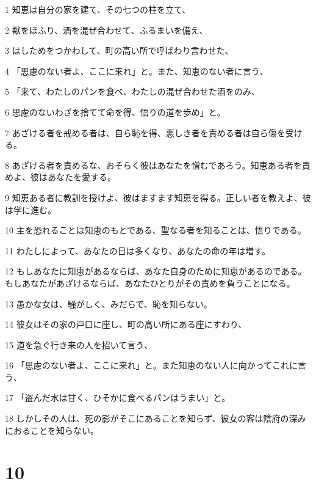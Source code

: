 \par 1 知恵は自分の家を建て、その七つの柱を立て、
\par 2 獣をほふり、酒を混ぜ合わせて、ふるまいを備え、
\par 3 はしためをつかわして、町の高い所で呼ばわり言わせた、
\par 4 「思慮のない者よ、ここに来れ」と。また、知恵のない者に言う、
\par 5 「来て、わたしのパンを食べ、わたしの混ぜ合わせた酒をのみ、
\par 6 思慮のないわざを捨てて命を得、悟りの道を歩め」と。
\par 7 あざける者を戒める者は、自ら恥を得、悪しき者を責める者は自ら傷を受ける。
\par 8 あざける者を責めるな、おそらく彼はあなたを憎むであろう。知恵ある者を責めよ、彼はあなたを愛する。
\par 9 知恵ある者に教訓を授けよ、彼はますます知恵を得る。正しい者を教えよ、彼は学に進む。
\par 10 主を恐れることは知恵のもとである、聖なる者を知ることは、悟りである。
\par 11 わたしによって、あなたの日は多くなり、あなたの命の年は増す。
\par 12 もしあなたに知恵があるならば、あなた自身のために知恵があるのである。もしあなたがあざけるならば、あなたひとりがその責めを負うことになる。
\par 13 愚かな女は、騒がしく、みだらで、恥を知らない。
\par 14 彼女はその家の戸口に座し、町の高い所にある座にすわり、
\par 15 道を急ぐ行き来の人を招いて言う、
\par 16 「思慮のない者よ、ここに来れ」と。また知恵のない人に向かってこれに言う、
\par 17 「盗んだ水は甘く、ひそかに食べるパンはうまい」と。
\par 18 しかしその人は、死の影がそこにあることを知らず、彼女の客は陰府の深みにおることを知らない。

\chapter{10}

